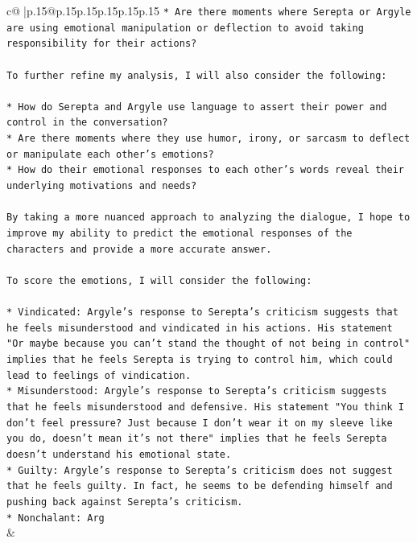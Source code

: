 \documentclass{article}
\begin{document}
{\begin{supertabular}{c@{$\;$}|p{.15\linewidth}@{}p{.15\linewidth}p{.15\linewidth}p{.15\linewidth}p{.15\linewidth}p{.15\linewidth}}
{{{\texttt{* Are there moments where Serepta or Argyle are using emotional manipulation or deflection to avoid taking responsibility for their actions?} \\
\\ 
\texttt{To further refine my analysis, I will also consider the following:} \\
\\ 
\texttt{* How do Serepta and Argyle use language to assert their power and control in the conversation?} \\
\texttt{* Are there moments where they use humor, irony, or sarcasm to deflect or manipulate each other's emotions?} \\
\texttt{* How do their emotional responses to each other's words reveal their underlying motivations and needs?} \\
\\ 
\texttt{By taking a more nuanced approach to analyzing the dialogue, I hope to improve my ability to predict the emotional responses of the characters and provide a more accurate answer.} \\
\\ 
\texttt{To score the emotions, I will consider the following:} \\
\\ 
\texttt{* Vindicated: Argyle's response to Serepta's criticism suggests that he feels misunderstood and vindicated in his actions. His statement "Or maybe because you can't stand the thought of not being in control" implies that he feels Serepta is trying to control him, which could lead to feelings of vindication.} \\
\texttt{* Misunderstood: Argyle's response to Serepta's criticism suggests that he feels misunderstood and defensive. His statement "You think I don't feel pressure? Just because I don't wear it on my sleeve like you do, doesn't mean it's not there" implies that he feels Serepta doesn't understand his emotional state.} \\
\texttt{* Guilty: Argyle's response to Serepta's criticism does not suggest that he feels guilty. In fact, he seems to be defending himself and pushing back against Serepta's criticism.} \\
\texttt{* Nonchalant: Arg} \\
            }
        }
    }
    & \\ \\

\end{supertabular}
}
\end{document}
